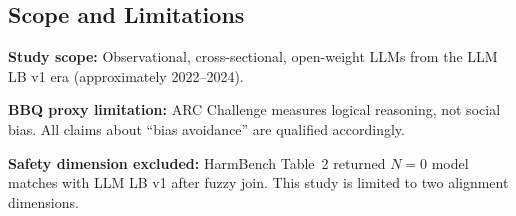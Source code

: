\subsection{Scope and Limitations}

\textbf{Study scope:} Observational, cross-sectional, open-weight LLMs from the LLM LB v1 era (approximately 2022--2024).

\textbf{BBQ proxy limitation:} ARC Challenge measures logical reasoning, not social bias. All claims about ``bias avoidance'' are qualified accordingly.

\textbf{Safety dimension excluded:} HarmBench Table~2 returned $N{=}0$ model matches with LLM LB v1 after fuzzy join. This study is limited to two alignment dimensions.
